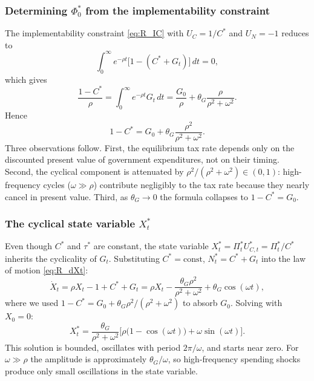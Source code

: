 \documentclass[12pt]{article}
\begin{document}
\subsubsection{Determining $\Phi_0^*$ from the implementability constraint}

The implementability constraint \eqref{eq:R_IC} with $U_C = 1/C^*$ and
$U_N = -1$ reduces to
\begin{equation}\label{eq:cyc_IC}
  \int_0^\infty e^{-\rho t}\bigl[1 - (C^*+G_t)\bigr]\, dt = 0,
\end{equation}
which gives
\begin{equation}\label{eq:cyc_PV}
  \frac{1-C^*}{\rho}
  = \int_0^\infty e^{-\rho t} G_t\, dt
  = \frac{G_0}{\rho}
  + \theta_G \frac{\rho}{\rho^2+\omega^2}.
\end{equation}
Hence
\begin{equation}\label{eq:cyc_tau}
  1-C^* = G_0 + \theta_G\frac{\rho^2}{\rho^2+\omega^2}.
\end{equation}
Three observations follow.  First, the equilibrium tax rate depends only on
the discounted present value of government expenditures, not on their timing.
Second, the cyclical component is attenuated by $\rho^2/(\rho^2+\omega^2)\in(0,1)$:
high-frequency cycles ($\omega\gg\rho$) contribute negligibly to the tax rate
because they nearly cancel in present value.  Third, as $\theta_G\to 0$ the
formula collapses to $1-C^* = G_0$.

\subsubsection{The cyclical state variable $X_t^*$}

Even though $C^*$ and $\tau^*$ are constant, the state variable
$X_t^* = \Pi_t^* U_{C,t}^* = \Pi_t^*/C^*$ inherits the cyclicality of $G_t$.
Substituting $C^* = \text{const}$, $N_t^* = C^*+G_t$ into the law of motion
\eqref{eq:R_dXt}:
\begin{equation}\label{eq:cyc_dX}
  \dot X_t = \rho X_t - 1 + C^* + G_t
  = \rho X_t - \frac{\theta_G\rho^2}{\rho^2+\omega^2}
    + \theta_G\cos(\omega t),
\end{equation}
where we used $1-C^* = G_0 + \theta_G\rho^2/(\rho^2+\omega^2)$ to absorb
$G_0$.  Solving with $X_0 = 0$:
\begin{equation}\label{eq:cyc_Xsol}
  X_t^*
  = \frac{\theta_G}{\rho^2+\omega^2}
    \bigl[\rho\bigl(1-\cos(\omega t)\bigr) + \omega\sin(\omega t)\bigr].
\end{equation}
This solution is bounded, oscillates with period $2\pi/\omega$, and starts
near zero.  For $\omega \gg \rho$ the amplitude is approximately
$\theta_G/\omega$, so high-frequency spending shocks produce only small
oscillations in the state variable.
\end{document}
